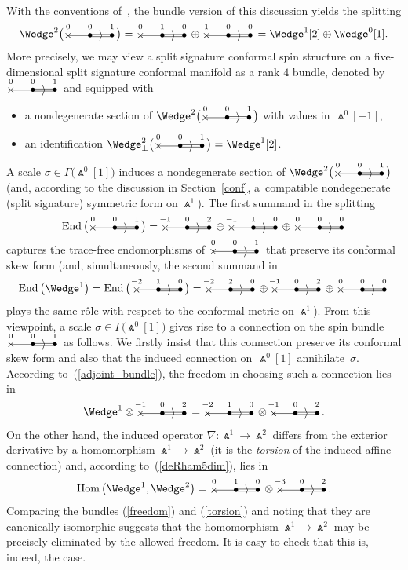 \documentclass[pdftex]{sigma}%
\numberwithin{equation}{section}
\newcommand{\Hom}{\operatorname{Hom}}
\newcommand{\End}{\operatorname{End}}
\newcommand{\bthree}[3]{\begin{picture}(48,11)
\put(4,1.5){\makebox(0,0){$\times$}}
\put(24,1.5){\makebox(0,0){$\bullet$}}
\put(44,1.5){\makebox(0,0){$\bullet$}}
\put(4,1.5){\line(1,0){20}}
\put(23,2.5){\line(1,0){20}}
\put(23,0.5){\line(1,0){20}}
\put(34,1.5){\makebox(0,0){$\rangle$}}
\put(4,10){\makebox(0,0){$\vphantom{(}\scriptstyle #1$}}
\put(24,10){\makebox(0,0){$\vphantom{(}\scriptstyle #2$}}
\put(44,10){\makebox(0,0){$\vphantom{(}\scriptstyle #3$}}
\end{picture}}
\begin{document}
With the conventions of~\cite{BE}, the bundle version of this discussion yields
the splitting
\[\Wedge^2\big(\bthree{0}{0}{1}\big)=\bthree{0}{1}{0}\oplus\bthree{1}{0}{0}
=\Wedge^1[2]\oplus\Wedge^0[1].\]
More precisely, we may view a split signature conformal spin structure on a
five-dimensional split signature conformal manifold as a rank $4$ bundle,
denoted by $\bthree{0}{0}{1}$ and equipped with
\begin{itemize}\itemsep=0pt
\item a nondegenerate section of $\Wedge^2\big(\bthree{0}{0}{1}\big)$ with values
in~$\Wedge^0[-1]$,
\item an identification
$\Wedge_\perp^2\big(\bthree{0}{0}{1}\big)=\Wedge^1[2]$.
\end{itemize}
A scale $\sigma\in\Gamma\big({\Wedge}^0[1]\big)$ induces a nondegenerate section of
$\Wedge^2\big(\bthree{0}{0}{1}\big)$ (and, according to the discussion in Section~\ref{conf}, a~compatible nondegenerate (split signature) symmetric form on
$\Wedge^1$).
The first summand in the splitting
\begin{equation}\label{adjoint_bundle}
\End\big(\bthree{0}{0}{1}\big)=\bthree{-1}{0}{2}\oplus\bthree{-1}{1}{0}
\oplus\bthree{0}{0}{0}\end{equation}
captures the trace-free endomorphisms of $\bthree{0}{0}{1}$ that preserve its
conformal skew form \big(and, simultaneously, the second summand in
\[\End\big({\Wedge}^1\big)=\End\big(\, \bthree{-2}{1}{0}\big)
=\bthree{-2}{2}{0}\oplus\bthree{-1}{0}{2}\oplus\bthree{0}{0}{0}\]
plays the same r\^ole with respect to the conformal metric on $\Wedge^1$\big).
{From} this viewpoint, a scale $\sigma\in\Gamma\big({\Wedge}^0[1]\big)$ gives rise to a
connection on the spin bundle $\bthree{0}{0}{1}$ as follows. We firstly insist
that this connection preserve its conformal skew form and also that the induced
connection on~$\Wedge^0[1]$ annihilate~$\sigma$. According to~(\ref{adjoint_bundle}), the freedom in choosing such a connection lies in
\begin{equation}\label{freedom}
\Wedge^1\otimes\bthree{-1}{0}{2}
=\bthree{-2}{1}{0}\otimes\bthree{-1}{0}{2}.\end{equation}
On the other hand, the induced operator $\nabla\colon \Wedge^1\to\Wedge^2$ differs
from the exterior derivative by a homomorphism $\Wedge^1\to\Wedge^2$ (it is the
{\em torsion} of the induced affine connection) and, according
to~(\ref{deRham5dim}), lies in
\begin{equation}\label{torsion}
\Hom\big({\Wedge}^1,\Wedge^2\big)=\bthree{0}{1}{0}\otimes\bthree{-3}{0}{2}.
\end{equation}
Comparing the bundles (\ref{freedom}) and (\ref{torsion}) and noting that they
are canonically isomorphic suggests that the homomorphism $\Wedge^1\to\Wedge^2$
may be precisely eliminated by the allowed freedom. It is easy to check that
this is, indeed, the case.
\end{document}
